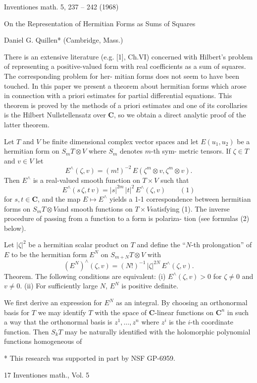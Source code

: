 Inventiones math. 5, 237 -- 242 (1968)

On the Representation of Hermitian Forms
as Sums of Squares

Daniel G. Quillen* (Cambridge, Mass.)

There is an extensive literature (e.g. [1], Ch.VI) concerned with
Hilbert's problem of representing a positive-valued form with real
coefficients as a sum of squares. The corresponding problem for her-%
mitian forms does not seem to have been touched. In this paper we
present a theorem about hermitian forms which arose in connection
with a priori estimates for partial differential equations. This theorem is
proved by the methods of a priori estimates and one of its corollaries
is the Hilbert Nullstellensatz over $\mathbf{C}$, so we obtain a direct analytic proof
of the latter theorem.

Let $T$ and $V$ be finite dimensional complex vector spaces and let
$E(u_1,u_2)$ be a hermitian form on $S_m T\otimes V$ where $S_m$ denotes $m$-th sym-%
metric tensors. If $\zeta\in T$ and $v\in V$ let
\[ E^{\wedge}(\zeta,v)=(m!)^{-2}\,E(\zeta^m\otimes v,\zeta^m\otimes v). \]
Then $E^{\wedge}$ is a real-valued smooth function on $T\times V$ such that
\[ E^{\wedge}(s\,\zeta,t\,v)=|s|^{2m}\,|t|^2\,E^{\wedge}(\zeta,v) \qquad (1) \]
for $s,t\in\mathbf{C}$, and the map $E\mapsto E^{\wedge}$ yields a 1-1 correspondence between
hermitian forms on $S_m T\otimes V$and smooth functions on $T\times V$satisfying (1).
The inverse procedure of passing from a function to a form is polariza-%
tion (see formulas (2) below).

Let $|\zeta|^2$ be a hermitian scalar product on $T$ and define the ``$N$-th
prolongation'' of $E$ to be the hermitian form $E^N$ on $S_{m+N}T\otimes V$ with
\[ (E^N)^{\wedge}(\zeta,v)=(N!)^{-1}\,|\zeta|^{2N}\,E^{\wedge}(\zeta,v). \]
Theorem. The following conditions are equivalent:
(i) $E^{\wedge}(\zeta,v)>0$ for $\zeta\neq 0$ and $v\neq 0$.
(ii) For sufficiently large $N$, $E^N$ is positive definite.

We first derive an expression for $E^N$ as an integral. By choosing an
orthonormal basis for $T$ we may identify $T$ with the space of $\mathbf{C}$-linear
functions on $\mathbf{C}^n$ in such a way that the orthonormal basis is $z^1,\dots,z^n$
where $z^i$ is the $i$-th coordinate function. Then $S_k T$ may be naturally
identified with the holomorphic polynomial functions homogeneous of

* This research was supported in part by NSF GP-6959.

17 Inventiones math., Vol. 5

